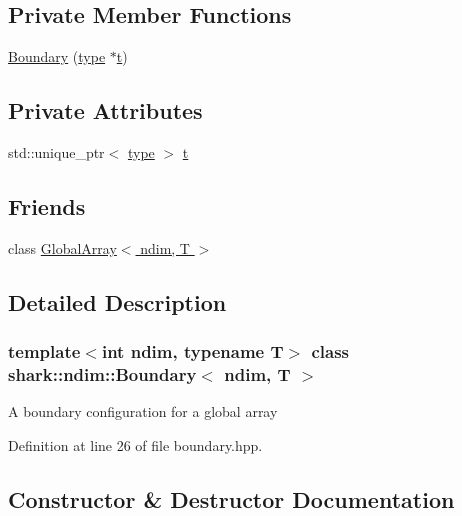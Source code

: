 \subsection*{Private Member Functions}
\begin{DoxyCompactItemize}
\item 
\hyperlink{classshark_1_1ndim_1_1_boundary_a3f693c16698630570f577f618f9f02ff}{Boundary} (\hyperlink{classshark_1_1ndim_1_1_boundary_1_1type}{type} $\ast$\hyperlink{classshark_1_1ndim_1_1_boundary_a16fdfa33d88480b4127ff36c1f1a2ce7}{t})
\end{DoxyCompactItemize}
\subsection*{Private Attributes}
\begin{DoxyCompactItemize}
\item 
std\+::unique\+\_\+ptr$<$ \hyperlink{classshark_1_1ndim_1_1_boundary_1_1type}{type} $>$ \hyperlink{classshark_1_1ndim_1_1_boundary_a16fdfa33d88480b4127ff36c1f1a2ce7}{t}
\end{DoxyCompactItemize}
\subsection*{Friends}
\begin{DoxyCompactItemize}
\item 
class \hyperlink{classshark_1_1ndim_1_1_boundary_ae56b9154646ac1569c81ea1215860995}{Global\+Array$<$ ndim, T $>$}
\end{DoxyCompactItemize}


\subsection{Detailed Description}
\subsubsection*{template$<$int ndim, typename T$>$\newline
class shark\+::ndim\+::\+Boundary$<$ ndim, T $>$}

A boundary configuration for a global array 

Definition at line 26 of file boundary.\+hpp.



\subsection{Constructor \& Destructor Documentation}
\hypertarget{classshark_1_1ndim_1_1_boundary_a3f693c16698630570f577f618f9f02ff}{}\label{classshark_1_1ndim_1_1_boundary_a3f693c16698630570f577f618f9f02ff} 
